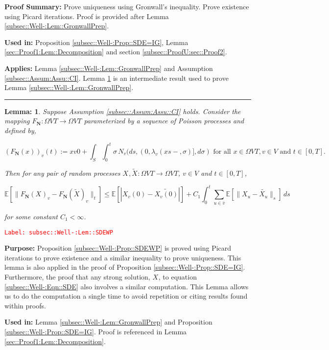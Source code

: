 \documentclass[12pt]{article}
\newcommand{\mb}{\mathbb}
\newcommand{\ra}{\rightarrow}
\newcommand{\ov}{\overline}
\newcommand{\te}{\text}
\newcommand{\tr}{\textcolor{red}}
\newcommand{\labe}[1]{\tr{\texttt{Label: #1}}}
\newcommand{\purpose}{\textbf{Purpose: }}
\newcommand{\pfsum}{\textbf{Proof Summary: }}
\newcommand{\usein}{\textbf{Used in: }}
\newcommand{\app}{\textbf{Applies: }}
\newcommand{\lin}{\rule{\linewidth}{0.4 pt}}
\newcommand{\ex}[1]{\mb{E}\left[#1\right]}			%
\renewcommand{\v}{v}							%
\newcommand{\vv}{u}								%
\renewcommand{\S}{S}							%
\newcommand{\s}{\sigma}							%
\newcommand{\T}{T}								%
\newcommand{\x}{x}								%
\renewcommand{\t}{t}							%
\renewcommand{\tt}{s}							%
\newcommand{\cl}{\ov}							%
\newcommand{\poiss}[1]{N_{#1}}						%
\newcommand{\poisses}{\mathbf{N}}				%
\newcommand{\V}{V}									%
\newcommand{\rxvt}[2]{X_{#1}{(#2)}}					%
\newcommand{\rxvts}[2]{X_{#1}{#2}}					%
\newcommand{\rate}[1]{\lambda_{#1}}					%
\newcommand{\const}[1]{C_{#1}}						%
\newcommand{\alt}{\widetilde}						%
\newtheorem{lem}[thms]{Lemma: }
\begin{document}
\pfsum Prove uniqueness using Gronwall's inequality. Prove existence using Picard iterations. Proof is provided after Lemma \ref{subsec::Well-:Lem::GronwallPrep}.

\usein Proposition \ref{subsec::Well-:Prop::SDE=IG}, Lemma \ref{sec::Proof1:Lem::Decomposition} and section \ref{subsec::ProofU:sec::Proof2}.

\app Lemma \ref{subsec::Well-:Lem::GronwallPrep} and Assumption \ref{subsec::Assum:Assu::CI}. Lemma \ref{subsec::Well-:Lem::SDEWP} is an intermediate result used to prove Lemma \ref{subsec::Well-:Lem::GronwallPrep}.

\lin

\begin{lem}
Suppose Assumption \ref{subsec::Assum:Assu::CI} holds. Consider the mapping \(F_\poisses: \Omega{\V}{\T} \ra \Omega{\V}{\T}\) parameterized by a sequence of Poisson processes and defined by,

\[\left(F_\poisses(\x{}{})\right)_\v(\t) := \x{\v}{0} + \int_\S\int_0^\t \s \,\poiss{\v}(d\tt,(0,\rate{\v}(\x{}{\tt-},\s)],d\s) \te{ for all }\x{}{} \in \Omega{\V}{\T}, \v \in \V\te{ and }\t \in [0,\T].\]

Then for any pair of random processes \(\rxvts{}{},\alt{\rxvts{}{}}:\Omega{\V}{\T} \ra \Omega{\V}{\T}\), \(\v\in \V\) and \(\t \in [0,\T]\),

\[\ex{\|F_\poisses(\rxvts{}{})_\v - F_\poisses(\alt{\rxvts{}{}})_\v\|_\t} \leq \ex{|\rxvt{\v}{0} - \alt{\rxvt{\v}{0}}|} +  \const{1}\int_0^\t \sum_{\vv\in \cl{\v}} \ex{\|\rxvts{\vv}{} - \alt{\rxvts{\vv}{}}\|_\tt}\,d\tt\]

for some constant \(\const{1} < \infty\).

\label{subsec::Well-:Lem::SDEWP}
\end{lem}
\labe{subsec::Well-:Lem::SDEWP}

\purpose Proposition \ref{subsec::Well-:Prop::SDEWP} is proved using Picard iterations to prove existence and a similar inequality to prove uniqueness. This lemma is also applied in the proof of Proposition \ref{subsec::Well-:Prop::SDE=IG}. Furthermore, the proof that any strong solution, \(\rxvts{}{}\), to equation \eqref{subsec::Well-:Eqn::SDE} also involves a similar computation. This Lemma allows us to do the computation a single time to avoid repetition or citing results found within proofs.

\usein Lemma \ref{subsec::Well-:Lem::GronwallPrep} and Proposition \ref{subsec::Well-:Prop::SDE=IG}. Proof is referenced in Lemma \ref{sec::Proof1:Lem::Decomposition}.
\end{document}

